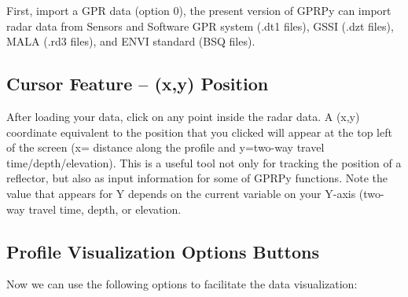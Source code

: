 \documentclass[12pt]{article}
\begin{document}
First, import a GPR data (option 0), the present version of GPRPy can import radar data from Sensors and Software GPR system (.dt1 files), GSSI (.dzt files), MALA (.rd3 files), and ENVI standard (BSQ files).



	\subsection{Cursor Feature – (x,y) Position}

After loading your data, click on any point inside the radar data. A (x,y) coordinate equivalent to the position that you clicked will appear at the top left of the screen (x= distance along the profile and y=two-way travel time/depth/elevation). This is a useful tool not only for tracking the position of a reflector, but also as input information for some of GPRPy functions. 
	Note the value that appears for Y depends on the current variable on your Y-axis (two-way travel time, depth, or elevation.



	\subsection{Profile Visualization Options Buttons}
	
	Now we can use the following options to facilitate the data visualization: 
\end{document}
